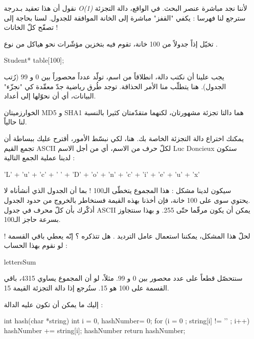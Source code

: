 \begin{information}
نقول أن هذا تعقيد بـدرجة
\textit{\textenglish{O(1)}}
لأننا نجد مباشرة عنصر البحث. في الواقع، دالة التجزئة سترجع لنا فهرسا : يكفي "القفز" مباشرة إلى الخانة الموافقة للجدول. لسنا بحاجة إلى تصفّح كلّ الخانات !
\end{information}

تخيّل إذاً جدولاً من 100 خانة، تقوم فيه بتخزين مؤشّرات نحو هياكل من نوع
.

\begin{Csource}
Student* table[100];
\end{Csource}

يجب علينا أن نكتب دالة، انطلاقاً من اسم، تولّد عدداً محصوراً بين 0 و 99 (رُتب الجدول). هنا يتطلّب منا الأمر الحذاقة. توجد طُرق رياضية جدّ معقّدة كي "نجزّء" البيانات، أي أن نحوّلها إلى أعداد.

\begin{information}
الخوارزميتان
\textenglish{MD5}
و
\textenglish{SHA1}
هما دالتا تجزئة مشهورتان، لكنهما متقدّمتان كثيرا بالنسبة لنا حالياً.
\end{information}

يمكنك اختراع دالة التجزئة الخاصة بك. هنا، لكي نبسّط الأمور، أقترح عليك ببساطة أن تجمع القيم
\textenglish{ASCII}
لكلّ حرف من الاسم، أي من أجل الاسم
\textenglish{Luc Doncieux}
ستكون لدينا عملية الجمع التالية :

\begin{Csource}
'L' + 'u' + 'c' + ' ' + 'D' + 'o' + 'n' + 'c' + 'i' + 'e' + 'u' + 'x'
\end{Csource}

سيكون لدينا مشكل : هذا المجموع يتخطّى الـ100 ! بما أن الجدول الذي أنشأناه لا يحتوي سوى على 100 خانة، فإن أخذنا بهذه القيمة فسنخاطر بالخروج من حدود الجدول.\\
أذكّرك بأن كلّ محرف في جدول
\textenglish{ASCII}
يمكن أن يكون مرقّما حتّى 255. و بهذا سنتجاوز بسرعة حاجز الـ100.

لحلّ هذا المشكل، يمكننا استعمال عامل الترديد
\InlineCode{\%}.
هل تتذكره ؟ إنّه يعطي باقي القسمة ! لو نقوم بهذا الحساب :

\begin{Csource}
lettersSum %
\end{Csource}

سنتحصّل قطعاً على عدد محصور بين 0 و 99. مثلاً، لو أن المجموع يساوي 4315، باقي القسمة على 100 هو 15. ستُرجع إذا دالة التجزئة القيمة 15.

إليك ما يمكن أن تكون عليه الدالة :

\begin{Csource}
int hash(char *string)
{
	int i = 0, hashNumber= 0;
	for (i = 0 ; string[i] != '\0' ; i++)
	{
		hashNumber += string[i];
	}
	hashNumber %
	return hashNumber;
}
\end{Csource}

